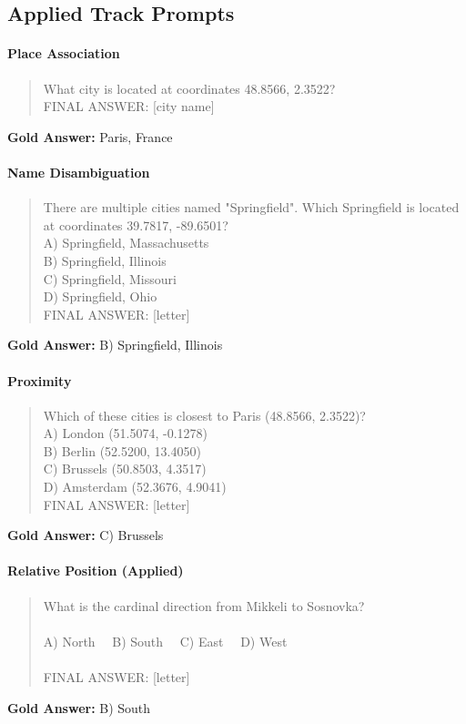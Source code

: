 \subsection{Applied Track Prompts}

\paragraph{Place Association}
\begin{quote}\ttfamily\small
What city is located at coordinates 48.8566, 2.3522?\\
FINAL ANSWER: [city name]
\end{quote}
\textbf{Gold Answer:} Paris, France

\paragraph{Name Disambiguation}
\begin{quote}\ttfamily\small
There are multiple cities named "Springfield". Which Springfield is located at coordinates 39.7817, -89.6501?\\
A) Springfield, Massachusetts\\
B) Springfield, Illinois\\
C) Springfield, Missouri\\
D) Springfield, Ohio\\
FINAL ANSWER: [letter]
\end{quote}
\textbf{Gold Answer:} B) Springfield, Illinois

\paragraph{Proximity}
\begin{quote}\ttfamily\small
Which of these cities is closest to Paris (48.8566, 2.3522)?\\
A) London (51.5074, -0.1278)\\
B) Berlin (52.5200, 13.4050)\\
C) Brussels (50.8503, 4.3517)\\
D) Amsterdam (52.3676, 4.9041)\\
FINAL ANSWER: [letter]
\end{quote}
\textbf{Gold Answer:} C) Brussels

\paragraph{Relative Position (Applied)}
\begin{quote}\ttfamily\small
What is the cardinal direction from Mikkeli to Sosnovka?\\
\\
A) North ~~B) South ~~C) East ~~D) West\\
\\
FINAL ANSWER: [letter]
\end{quote}
\textbf{Gold Answer:} B) South

